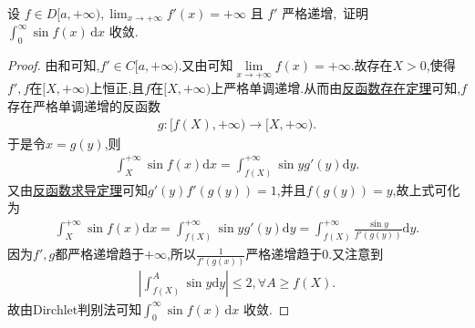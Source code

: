 \documentclass[../../main.tex]{subfiles}%
\begin{document}
\begin{example}
设
\(
f \in D[a, +\infty), \lim_{x \to +\infty} f'(x) = +\infty \text{ 且 } f' \text{ 严格递增},
\)
证明 \(\int_{0}^{\infty} \sin f(x) \, \mathrm{d}x\) 收敛.
\end{example}
\begin{proof}

由和可知,$f'\in C[a,+\infty)$.又由可知$\underset{x\rightarrow +\infty}{\lim}f\left( x \right) =+\infty$.故存在$X>0$,使得$f',f$在$[X,+\infty)$上恒正,且$f$在$[X,+\infty)$上严格单调递增.从而由\hyperref[theorem:反函数存在定理]{反函数存在定理}可知,$f$存在严格单调递增的反函数
\begin{align*}
g:[f(X),+\infty)\to [X,+\infty).
\end{align*}
于是令$x=g(y)$,则
\begin{align*}
\int_X^{+\infty}{\sin f\left( x \right) \mathrm{d}x}=\int_{f\left( X \right)}^{+\infty}{\sin y}g'\left( y \right) \mathrm{d}y.
\end{align*}
又由\hyperref[theorem:反函数求导定理]{反函数求导定理}可知$g'(y)f'(g(y))=1$,并且$f(g(y))=y$,故上式可化为
\begin{align*}
\int_X^{+\infty}{\sin f\left( x \right) \mathrm{d}x}=\int_{f\left( X \right)}^{+\infty}{\sin y}g' \left( y \right) \mathrm{d}y=\int_{f\left( X \right)}^{+\infty}{\frac{\sin y}{f'\left( g\left( y \right) \right)}}\mathrm{d}y.
\end{align*}
因为$f',g$都严格递增趋于$+\infty$,所以$\frac{1}{f'(g(x))}$严格递增趋于0.又注意到
\begin{align*}
\left| \int_{f\left( X \right)}^A{\sin y}\mathrm{d}y \right|\leqslant 2,\forall A\geqslant f\left( X \right) .
\end{align*}
故由Dirchlet判别法可知\(\int_{0}^{\infty} \sin f(x) \, \mathrm{d}x\) 收敛.

\end{proof}
\end{document}

